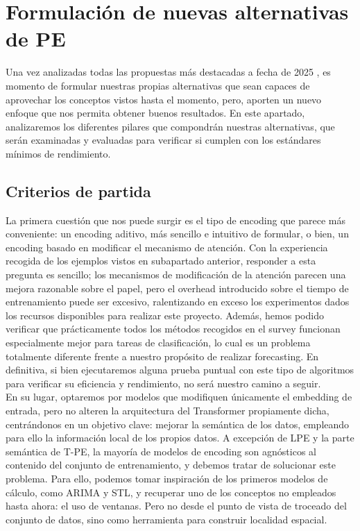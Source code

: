 \section{Formulación de nuevas alternativas de PE}

Una vez analizadas todas las propuestas más destacadas a fecha de 2025 \cite{irani2025positionalencodingtransformerbasedtime}, es momento de formular nuestras propias alternativas que sean capaces de aprovechar los conceptos vistos hasta el momento, pero, aporten un nuevo enfoque que nos permita obtener buenos resultados. En este apartado, analizaremos los diferentes pilares que compondrán nuestras alternativas, que serán examinadas y evaluadas para verificar si cumplen con los estándares mínimos de rendimiento.

\subsection{Criterios de partida}

La primera cuestión que nos puede surgir es el tipo de encoding que parece más conveniente: un encoding aditivo, más sencillo e intuitivo de formular, o bien, un encoding basado en modificar el mecanismo de atención. Con la experiencia recogida de los ejemplos vistos en subapartado anterior, responder a esta pregunta es sencillo; los mecanismos de modificación de la atención parecen una mejora razonable sobre el papel, pero el overhead introducido sobre el tiempo de entrenamiento puede ser excesivo, ralentizando en exceso los experimentos dados los recursos disponibles para realizar este proyecto. Además, hemos podido verificar que prácticamente todos los métodos recogidos en el survey funcionan especialmente mejor para tareas de clasificación, lo cual es un problema totalmente diferente frente a nuestro propósito de realizar forecasting. En definitiva, si bien ejecutaremos alguna prueba puntual con este tipo de algoritmos para verificar su eficiencia y rendimiento, no será nuestro camino a seguir.\\

En su lugar, optaremos por modelos que modifiquen únicamente el embedding de entrada, pero no alteren la arquitectura del Transformer propiamente dicha, centrándonos en un objetivo clave: mejorar la semántica de los datos, empleando para ello la información local de los propios datos. A excepción de LPE y la parte semántica de T-PE, la mayoría de modelos de encoding son agnósticos al contenido del conjunto de entrenamiento, y debemos tratar de solucionar este problema. Para ello, podemos tomar inspiración de los primeros modelos de cálculo, como ARIMA y STL, y recuperar uno de los conceptos no empleados hasta ahora: el uso de ventanas. Pero no desde el punto de vista de troceado del conjunto de datos, sino como herramienta para construir localidad espacial.\\

